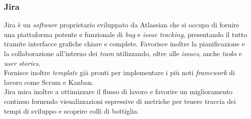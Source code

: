 \subsubsection{Jira}
Jira è un \textit{software} proprietario sviluppato da Atlassian che si occupa di fornire una piattaforma potente e funzionale di \textit{bug} e \textit{issue tracking}, presentando il tutto tramite interfacce grafiche chiare e complete. Favorisce inoltre la pianificazione e la collaborazione all'interno dei \textit{team} utilizzando, oltre alle \textit{issues}, anche \textit{tasks} e \textit{user stories}.\\
Fornisce inoltre \textit{template} già pronti per implementare i più noti \textit{framework} di lavoro come Scrum e Kanban.\\
Jira mira inoltre a ottimizzare il flusso di lavoro e favorire un miglioramento continuo fornendo visualizzazioni espressive di metriche per tenere traccia dei tempi di sviluppo e scoprire colli di bottiglia.

